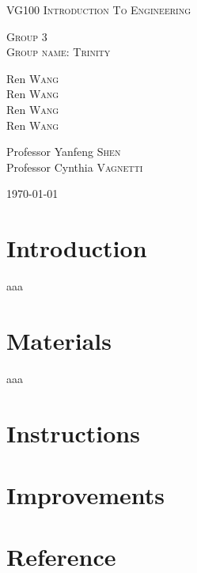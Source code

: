 \documentclass[12pt,a4paper]{article}
\begin{document}
\linespread{2}



\begin{center}
\vspace*{0.7in}
\vspace*{0.7in}






\begin{center} 

{
\linespread{2}
\huge
\textsc{VG100 Introduction To Engineering} \\
}

\vspace*{0.7in}

\textsc{Group 3}\\
\textsc{Group name: Trinity}\\

\vspace*{0.7in}

Ren \textsc{Wang}\\
Ren \textsc{Wang}\\
Ren \textsc{Wang}\\
Ren \textsc{Wang}\\

\vspace*{0.7in}

Professor Yanfeng \textsc{Shen} \\
Professor Cynthia \textsc{Vagnetti} 



{\large \today}


\end{center}



\end{center}
\newpage



\tableofcontents
\newpage

\section{Introduction}
aaa
\section{Materials}
aaa
\section{Instructions}
\section{Improvements}
\section{Reference}
\end{document}
